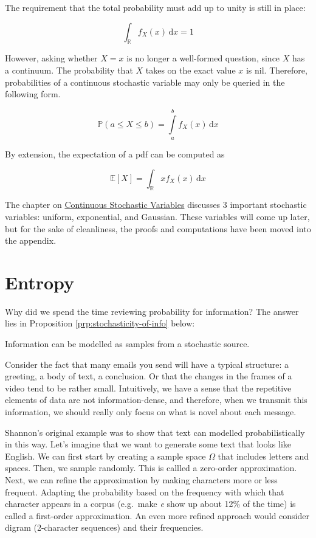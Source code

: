 \documentclass[13pt,oneside]{tufte-book}
\theoremstyle{definition}
\theoremstyle{definition}
\theoremstyle{definition}
\theoremstyle{remark}
\let\BeginKnitrBlock\begin \let\EndKnitrBlock\end
\begin{document}
The requirement that the total probability must add up to unity is still
in place:

\[
\int_{\mathbb{R}} f_X(x)\,\mathrm{d}x=1
\]

However, asking whether \(X=x\) is no longer a well-formed question,
since \(X\) has a continuum. The probability that \(X\) takes on the
exact value \(x\) is nil. Therefore, probabilities of a continuous
stochastic variable may only be queried in the following form.

\[
\mathbb{P}(a\leq X \leq b) = \int\limits_{a}^{b}f_X(x)\,\mathrm{d}x
\]

By extension, the expectation of a pdf can be computed as

\[
\mathbb{E}[X] = \int_{\mathbb{R}}xf_X(x)\,\mathrm{d}x
\]

The chapter on
\protect\hyperlink{continuous-stochastic-variables}{Continuous
Stochastic Variables} discusses 3 important stochastic variables:
uniform, exponential, and Gaussian. These variables will come up later,
but for the sake of cleanliness, the proofs and computations have been
moved into the appendix.

\chapter{Entropy}\label{entropy}

Why did we spend the time reviewing probability for information? The
answer lies in Proposition \ref{prp:stochasticity-of-info} below:

\BeginKnitrBlock{proposition}[Stochasticity of Information]
\protect\hypertarget{prp:stochasticity-of-info}{}{\label{prp:stochasticity-of-info}
{} } Information can be
modelled as samples from a stochastic source.
\EndKnitrBlock{proposition}

Consider the fact that many emails you send will have a typical
structure: a greeting, a body of text, a conclusion. Or that the changes
in the frames of a video tend to be rather small. Intuitively, we have a
sense that the repetitive elements of data are not information-dense,
and therefore, when we transmit this information, we should really only
focus on what is novel about each message.

Shannon's original example was to show that text can modelled
probabilistically in this way. Let's imagine that we want to generate
some text that looks like English. We can first start by creating a
sample space \(\Omega\) that includes letters and spaces. Then, we
sample randomly. This is callled a zero-order approximation. Next, we
can refine the approximation by making characters more or less frequent.
Adapting the probability based on the frequency with which that
character appears in a corpus (e.g.~make \emph{e} show up about 12\% of
the time) is called a first-order approximation. An even more refined
approach would consider digram (2-character sequences) and their
frequencies.
\end{document}
